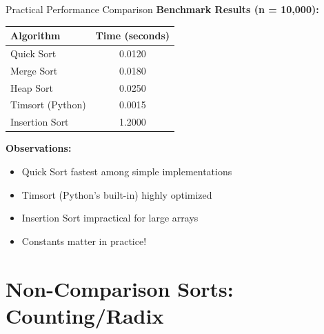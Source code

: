 \documentclass[aspectratio=169]{beamer}
\begin{document}
\begin{frame}{Practical Performance Comparison}
  \textbf{Benchmark Results (n = 10,000):}

  \vspace{0.3cm}
  \begin{center}
  \begin{tabular}{|l|c|}
    \hline
    \textbf{Algorithm} & \textbf{Time (seconds)} \\
    \hline
    Quick Sort & 0.0120 \\
    \hline
    Merge Sort & 0.0180 \\
    \hline
    Heap Sort & 0.0250 \\
    \hline
    Timsort (Python) & 0.0015 \\
    \hline
    Insertion Sort & 1.2000 \\
    \hline
  \end{tabular}
  \end{center}

  \vspace{0.3cm}
  \textbf{Observations:}
  \begin{itemize}
    \item Quick Sort fastest among simple implementations
    \item Timsort (Python's built-in) highly optimized
    \item Insertion Sort impractical for large arrays
    \item Constants matter in practice!
  \end{itemize}
\end{frame}

\section{Non-Comparison Sorts: Counting/Radix}
\end{document}
